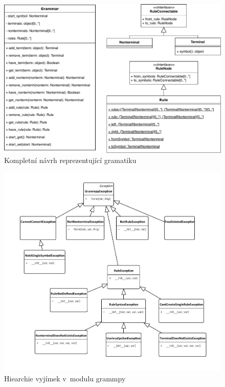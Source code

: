 	\begin{figure}				
		\centering
		\includegraphics[width=0.9\linewidth]{img/WholeGrammpy}
		\caption{Kompletní návrh reprezentující gramatiku}
		\label{fig:grammpyWhole}
	\end{figure}

	\begin{figure}				
		\centering
		\includegraphics[width=0.8\linewidth]{img/grammpyExceptions}
		\caption{Hiearchie vyjímek v~modulu grammpy}
		\label{fig:grammpyExceptions}
	\end{figure}

